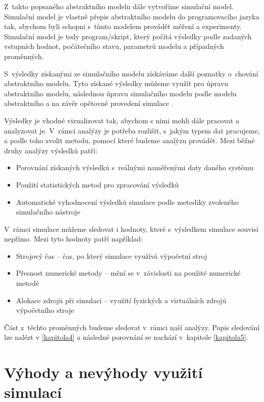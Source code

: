 Z~takto popsaného abstraktního modelu dále vytvoříme simulační model. Simulační model je vlastně přepis abstraktního modelu do programovacího jazyka tak, abychom byli schopni s~tímto modelem provádět měření a experimenty. Simulační model je tedy program/skript, který počítá výsledky podle zadaných vstupních hodnot, počátečního stavu, parametrů modelu a případných proměnných.

S~výsledky získanými ze simulačního modelu získáváme další poznatky o~chování abstraktního modelu. Tyto získané výsledky můžeme využít pro úpravu abstraktního modelu, následnou úpravu simulačního modelu podle modelu abstraktního a na závěr opětovné provedení simulace \cite{IMS-skripta}.

Výsledky je vhodné vizualizovat tak, abychom s nimi mohli dále pracovat a analyzovat je. V~rámci analýzy je potřeba rozlišit, s~jakým typem dat pracujeme, a podle toho zvolit metodu, pomocí které budeme analýzu provádět. Mezi běžné druhy analýzy výsledků patří:
\begin{itemize}
    \item Porovnání získaných výsledků s~reálnými naměřenými daty daného systému
    \item Použití statistických metod pro zpracování výsledků
    \item Automatické vyhodnocení výsledků simulace podle metodiky zvoleného simulačního nástroje
\end{itemize}

V~rámci simulace můžeme sledovat i hodnoty, které s~výsledkem simulace souvisí nepřímo. Mezi tyto hodnoty patří například:
\begin{itemize}
    \item Strojový čas -- čas, po který simulace využívá výpočetní stroj
    \item Přesnost numerické metody -- mění se v~závislosti na použité numerické metodě
    \item Alokace zdrojů při simulaci -- využití fyzických a virtuálních zdrojů výpočetního stroje
\end{itemize}


Část z~těchto proměnných budeme sledovat v~rámci naší analýzy. Popis sledování lze nalézt v  \ref{kapitola4} a následné porovnání se nachází v~kapitole \ref{kapitola5}.

\section{Výhody a nevýhody využití simulací}


